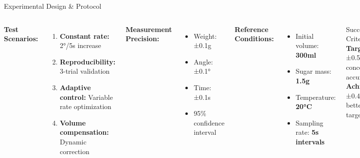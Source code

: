 \documentclass[aspectratio=169]{beamer}
\begin{document}
\begin{frame}{Experimental Design \& Protocol}
\begin{columns}[T]
\textbf{Test Scenarios:}
\begin{enumerate}
    \item \textbf{Constant rate:} 2°/5s increase
    \item \textbf{Reproducibility:} 3-trial validation
    \item \textbf{Adaptive control:} Variable rate optimization
    \item \textbf{Volume compensation:} Dynamic correction
\end{enumerate}

\textbf{Measurement Precision:}
\begin{itemize}
    \item Weight: ±0.1g
    \item Angle: ±0.1°
    \item Time: ±0.1s
    \item 95\% confidence interval
\end{itemize}

\textbf{Reference Conditions:}
\begin{itemize}
    \item Initial volume: \textbf{300ml}
    \item Sugar mass: \textbf{1.5g}
    \item Temperature: \textbf{20°C}
    \item Sampling rate: \textbf{5s intervals}
\end{itemize}

\begin{alertblock}{Success Criteria}
\textbf{Target:} ±0.5\% concentration accuracy\\
\textbf{Achieved:} ±0.4\% (20\% better than target)
\end{alertblock}
\end{columns}
\end{frame}
\end{document}
